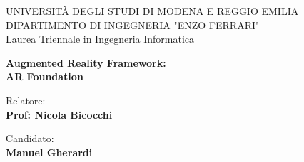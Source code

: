 \begin{titlepage}
\begin{figure}[!htb]
    \centering
\end{figure}
\vspace{30mm}
\begin{center}
    \LARGE{UNIVERSITÀ DEGLI STUDI DI MODENA E REGGIO EMILIA}
    \vspace{5mm}
    \\ \large{DIPARTIMENTO DI INGEGNERIA "ENZO FERRARI"}
    \vspace{5mm}
    \\ Laurea Triennale in Ingegneria Informatica
\end{center}

\vspace{15mm}
\begin{center}
    {\LARGE{\bf Augmented Reality Framework:\\ \vspace{5mm} AR Foundation }}
    
    
\end{center}
\vspace{30mm}

\begin{minipage}[t]{0.47\textwidth}
	{\large{Relatore:}{\normalsize\vspace{3mm}
	\bf\\ \large{Prof: Nicola Bicocchi}}}
\end{minipage}

\hfill
\begin{minipage}[t]{0.47\textwidth}\raggedleft
	{\large{Candidato:}{\normalsize\vspace{3mm} \bf\\ \large{Manuel Gherardi}}}
\end{minipage}

\vspace{30mm}
\hrulefill
\\

\end{titlepage}